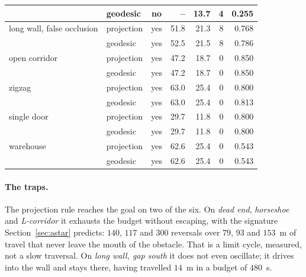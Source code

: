 \documentclass[11pt,a4paper]{article}
\begin{document}
\begin{table}[!ht]
\begin{tabular}{llcrrrr}
                                         & geodesic   & no              &     -- &  13.7 &    4 & 0.255 \\
    \midrule
    long wall, false occlusion           & projection & yes             &   51.8 &  21.3 &    8 & 0.768 \\
                                         & geodesic   & yes             &   52.5 &  21.5 &    8 & 0.786 \\
    \midrule\midrule
    open corridor                        & projection & yes             &   47.2 &  18.7 &    0 & 0.850 \\
                                         & geodesic   & yes             &   47.2 &  18.7 &    0 & 0.850 \\
    \midrule
    zigzag                               & projection & yes             &   63.0 &  25.4 &    0 & 0.800 \\
                                         & geodesic   & yes             &   63.0 &  25.4 &    0 & 0.813 \\
    \midrule
    single door                          & projection & yes             &   29.7 &  11.8 &    0 & 0.800 \\
                                         & geodesic   & yes             &   29.7 &  11.8 &    0 & 0.800 \\
    \midrule
    warehouse                            & projection & yes             &   62.6 &  25.4 &    0 & 0.543 \\
                                         & geodesic   & yes             &   62.6 &  25.4 &    0 & 0.543 \\
    \bottomrule
  \end{tabular}
\end{table}

\paragraph{The traps.} The projection rule reaches the goal on two of the six. On \emph{dead end},
\emph{horseshoe} and \emph{L-corridor} it exhausts the budget without escaping, with the signature
Section~\ref{sec:astar} predicts: $140$, $117$ and $300$ reversals over $79$, $93$ and $153$~m of travel
that never leave the mouth of the obstacle. That is a limit cycle, measured, not a slow traversal. On
\emph{long wall, gap south} it does not even oscillate; it drives into the wall and stays there, having
travelled $14$~m in a budget of $480$~s.
\end{document}
